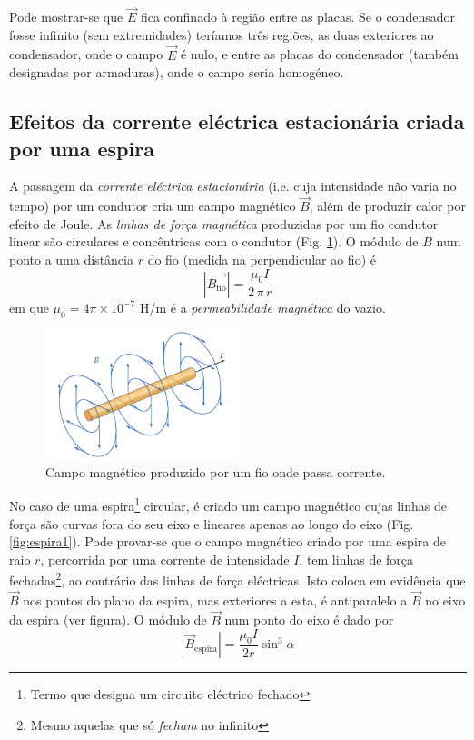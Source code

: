 \documentclass[a4paper,twoside,11pt]{report}      %
\begin{document}
Pode mostrar-se que $\vec{E}$ fica confinado à região entre as placas. Se o condensador fosse infinito (sem extremidades) teríamos três regiões, as duas exteriores ao condensador, onde o campo  $\vec{E}$  é nulo, e entre as placas do condensador (também designadas por armaduras), onde o campo seria homogéneo.


\subsection{\sf Efeitos da corrente eléctrica estacionária criada por uma espira}
A passagem da \emph{corrente eléctrica estacionária} (i.e. cuja intensidade não varia no tempo) por um condutor cria um campo magnético $\vec{B}$, além de produzir calor por efeito de Joule. As \emph{linhas de força magnética} produzidas por um fio condutor linear são circulares e concêntricas com o condutor (Fig. \ref{fig:condutor}). O módulo de $B$ num ponto a uma distância $r$ do fio (medida na perpendicular ao fio) é
\begin{equation}
	|\vec{B_{\mathrm{fio}}}| = \frac{\mu_0 I}{2\, \pi \, r} 
\end{equation}
 em que $\mu_0 =  4 \pi× 10^{−7}$ H/m é a \emph{permeabilidade magnética}  do vazio. 
 
 \begin{figure}[t]
	\centering 
	\includegraphics[width=0.5\textwidth]{fig-fio} 
	\caption{Campo magnético produzido por um fio onde passa corrente.}
	\label{fig:condutor}
\end{figure}

No caso de uma espira\footnote{Termo que designa um circuito eléctrico fechado} circular, é criado um campo magnético cujas linhas de força são curvas fora do seu eixo e lineares apenas ao longo do eixo (Fig. \ref{fig:espira1}). Pode provar-se que o campo magnético criado por uma espira de raio $r$, percorrida por uma corrente de intensidade $I$, tem linhas de força fechadas\footnote{Mesmo aquelas que só \emph{fecham} no infinito}, ao contrário das linhas de força eléctricas. Isto coloca em evidência que $\vec{B}$ nos pontos do plano da espira, mas exteriores a esta, é antiparalelo a $\vec{B}$ no eixo da espira (ver figura). O módulo de $\vec{B}$ num ponto do eixo é dado por
\begin{equation}
	|\vec{B}_{\mathrm{espira}}| = \frac{\mu_0 I}{2 r} \sin^3 \alpha
\end{equation}
\end{document}
